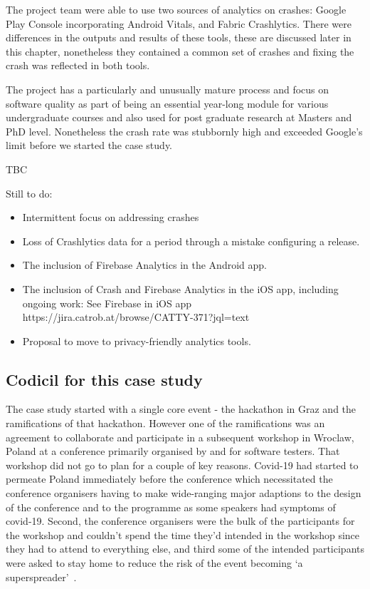 The project team were able to use two sources of analytics on crashes: Google Play Console incorporating Android Vitals, and Fabric Crashlytics. There were differences in the outputs and results of these tools, these are discussed later in this chapter, nonetheless they contained a common set of crashes and fixing the crash was reflected in both tools.

The project has a particularly and unusually mature process and focus on software quality as part of being an essential year-long module for various undergraduate courses and also used for post graduate research at Masters and PhD level. Nonetheless the crash rate was stubbornly high and exceeded Google's limit before we started the case study.

TBC

Still to do:
\begin{itemize}
    \item Intermittent focus on addressing crashes
    \item Loss of Crashlytics data for a period through a mistake configuring a release.
    \item The inclusion of Firebase Analytics in the Android app.
    \item The inclusion of Crash and Firebase Analytics in the iOS app, including ongoing work: See Firebase in iOS app https://jira.catrob.at/browse/CATTY-371?jql=text%
    \item Proposal to move to privacy-friendly analytics tools. 
\end{itemize}



\subsection{Codicil for this case study}
The case study started with a single core event - the hackathon in Graz and the ramifications of that hackathon. However one of the ramifications was an agreement to collaborate and participate in a subsequent workshop in Wroclaw, Poland at a conference primarily organised by and for software testers. That workshop did not go to plan for a couple of key reasons. Covid-19 had started to permeate Poland immediately before the conference which necessitated the conference organisers having to make wide-ranging major adaptions to the design of the conference and to the programme as some speakers had symptoms of covid-19. Second, the conference organisers were the bulk of the participants for the workshop and couldn't spend the time they'd intended in the workshop since they had to attend to everything else, and third some of the intended participants were asked to stay home to reduce the risk of the event becoming `a superspreader'~\citep{cave2020covid}.

